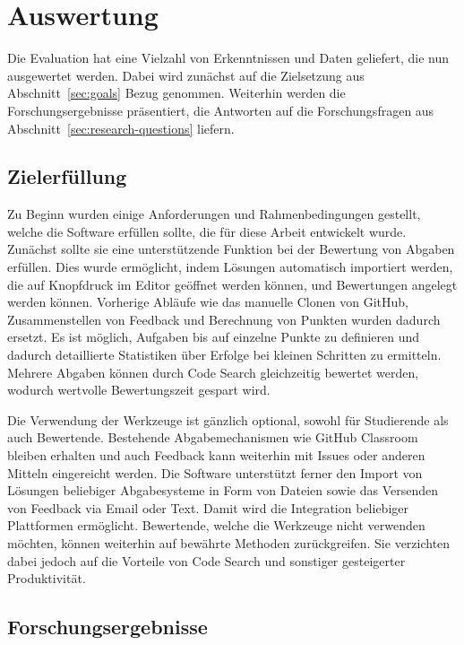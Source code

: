 \chapter{Auswertung}\label{ch:results}

Die Evaluation hat eine Vielzahl von Erkenntnissen und Daten geliefert, die nun ausgewertet werden.
Dabei wird zunächst auf die Zielsetzung aus Abschnitt~\ref{sec:goals} Bezug genommen.
Weiterhin werden die Forschungsergebnisse präsentiert, die Antworten auf die Forschungsfragen aus Abschnitt~\ref{sec:research-questions} liefern.

\section{Zielerfüllung}\label{sec:goals-reached}

Zu Beginn wurden einige Anforderungen und Rahmenbedingungen gestellt, welche die Software erfüllen sollte, die für diese Arbeit entwickelt wurde.
Zunächst sollte sie eine unterstützende Funktion bei der Bewertung von Abgaben erfüllen.
Dies wurde ermöglicht, indem Lösungen automatisch importiert werden, die auf Knopfdruck im Editor geöffnet werden können, und Bewertungen angelegt werden können.
Vorherige Abläufe wie das manuelle Clonen von GitHub, Zusammenstellen von Feedback und Berechnung von Punkten wurden dadurch ersetzt.
Es ist möglich, Aufgaben bis auf einzelne Punkte zu definieren und dadurch detaillierte Statistiken über Erfolge bei kleinen Schritten zu ermitteln.
Mehrere Abgaben können durch Code Search gleichzeitig bewertet werden, wodurch wertvolle Bewertungszeit gespart wird.

Die Verwendung der Werkzeuge ist gänzlich optional, sowohl für Studierende als auch Bewertende.
Bestehende Abgabemechanismen wie GitHub Classroom bleiben erhalten und auch Feedback kann weiterhin mit Issues oder anderen Mitteln eingereicht werden.
Die Software unterstützt ferner den Import von Lösungen beliebiger Abgabesysteme in Form von Dateien sowie das Versenden von Feedback via Email oder Text.
Damit wird die Integration beliebiger Plattformen ermöglicht.
Bewertende, welche die Werkzeuge nicht verwenden möchten, können weiterhin auf bewährte Methoden zurückgreifen.
Sie verzichten dabei jedoch auf die Vorteile von Code Search und sonstiger gesteigerter Produktivität.

\section{Forschungsergebnisse}\label{sec:research-results}

